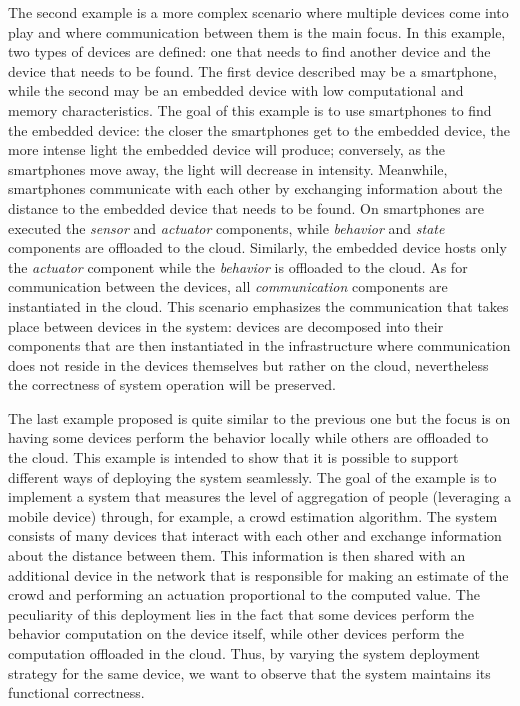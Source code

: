 The second example is a more complex scenario where multiple devices come into play and where communication between them is the main focus.
In this example, two types of devices are defined: one that needs to find another device and the device that needs to be found.
The first device described may be a smartphone, while the second may be an embedded device with low computational and memory characteristics.
The goal of this example is to use smartphones to find the embedded device: the closer the smartphones get to the embedded device, the more intense
light the embedded device will produce; conversely, as the smartphones move away, the light will decrease in intensity.
Meanwhile, smartphones communicate with each other by exchanging information about the distance to the embedded device that needs to be found.
On smartphones are executed the \emph{sensor} and \emph{actuator} components, while \emph{behavior} and \emph{state} components are offloaded to the
cloud. Similarly, the embedded device hosts only the \emph{actuator} component while the \emph{behavior} is offloaded to the cloud. As for
communication between the devices, all \emph{communication} components are instantiated in the cloud.
This scenario emphasizes the communication that takes place between devices in the system: devices are decomposed into their components that are then
instantiated in the infrastructure where communication does not reside in the devices themselves but rather on the cloud, nevertheless the
correctness of system operation will be preserved.

The last example proposed is quite similar to the previous one but the focus is on having some devices perform the behavior locally while others
are offloaded to the cloud. This example is intended to show that it is possible to support different ways of deploying the system seamlessly.
The goal of the example is to implement a system that measures the level of aggregation of people (leveraging a mobile device) through, for example,
a crowd estimation algorithm.
The system consists of many devices that interact with each other and exchange information about the distance between them. This information is then
shared with an additional device in the network that is responsible for making an estimate of the crowd and performing an actuation proportional
to the computed value. The peculiarity of this deployment lies in the fact that some devices perform the behavior computation on the device itself,
while other devices perform the computation offloaded in the cloud. Thus, by varying the system deployment strategy for the same device, we want to
observe that the system maintains its functional correctness.
